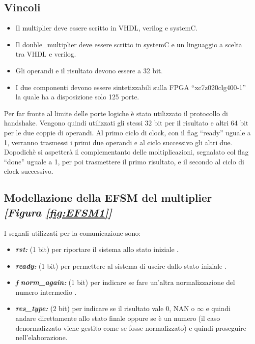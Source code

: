 \documentclass[]{IEEEtran}
\begin{document}
\subsection{Vincoli}
\begin{itemize}
    \item Il multiplier deve essere scritto in VHDL, verilog e systemC.
    \item Il double\_multiplier deve essere scritto in systemC e un linguaggio a scelta tra VHDL e verilog.
    \item Gli operandi e il risultato devono essere a 32 bit.
    \item I due componenti devono essere sintetizzabili sulla FPGA ``xc7z020clg400-1'' la quale ha a disposizione solo 125 porte.
\end{itemize}
Per far fronte al limite delle porte logiche è stato utilizzato il protocollo di handshake. Vengono quindi utilizzati gli stessi 32 bit per il risultato e altri 64 bit per le due coppie di operandi. Al primo ciclo di clock, con il flag ``ready'' uguale a 1, verranno trasmessi i primi due operandi e al ciclo successivo gli altri due. Dopodichè si aspetterà il complementanto delle moltiplicazioni, segnalato col flag ``done'' uguale a 1, per poi trasmettere il primo risultato, e il secondo al ciclo di clock successivo.

\subsection{Modellazione della EFSM del multiplier {\it [Figura \ref{fig:EFSM1}]}}
I segnali utilizzati per la comunicazione sono:
\begin{itemize}
    \item \textit{\textbf{rst:}} (1 bit) per riportare il sistema allo stato iniziale .
    \item {\it\bf ready:} (1 bit) per permettere al sistema di uscire dallo stato iniziale .
    \item \textbf{\textit{f}} {\it {\bf norm\_again:} } (1 bit) per indicare se fare un'altra normalizzazione del numero intermedio .
    \item {\it\bf res\_type:} (2 bit) per indicare se il risultato vale 0, NAN o \(\infty\) e quindi andare direttamente allo stato finale oppure se è un numero (il caso denormalizzato viene gestito come se fosse normalizzato) e quindi proseguire nell'elaborazione.
\end{itemize}
\end{document}
